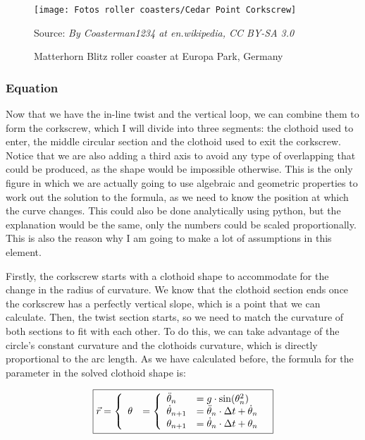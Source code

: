 \documentclass[12pt,twoside,a4paper]{article}
\newcommand{\source}[1]{\caption*{Source: \textit{#1}} }
\begin{document}
	\begin{figure}[H]
		\centering
		\texttt{[image: Fotos roller coasters/Cedar Point Corkscrew]}
		\caption{Matterhorn Blitz roller coaster at Europa Park, Germany}
		\label{fig:CedarPointCorkscrew}
		\source{By Coasterman1234 at en.wikipedia, CC BY-SA 3.0}
	\end{figure}
	
	\subsubsection{Equation}
	Now that we have the in-line twist and the vertical loop, we can combine them to form the corkscrew, which I will divide into three segments: the clothoid used to enter, the middle circular section and the clothoid used to exit the corkscrew. Notice that we are also adding a third axis to avoid any type of overlapping that could be produced, as the shape would be impossible otherwise. This is the only figure in which we are actually going to use algebraic and geometric properties to work out the solution to the formula, as we need to know the position at which the curve changes. This could also be done analytically using python, but the explanation would be the same, only the numbers could be scaled proportionally. This is also the reason why I am going to make a lot of assumptions in this element.
	
	Firstly, the corkscrew starts with a clothoid shape to accommodate for the change in the radius of curvature. We know that the clothoid section ends once the corkscrew has a perfectly vertical slope, which is a point that we can calculate. Then, the twist section starts, so we need to match the curvature of both sections to fit with each other. To do this, we can take advantage of the circle's constant curvature and the clothoids curvature, which is directly proportional to the arc length. As we have calculated before, the formula for the parameter in the solved clothoid shape is:
	
	$$\boxed{\vec{r} = \left\{\begin{array}{ll}
			\theta &= \left\{\begin{array}{ll}
				\ddot{\theta}_n &= g \cdot \sin(\theta^2_n) \cr
				\dot{\theta}_{n + 1} &= \ddot{\theta}_n \cdot \Delta t + \dot{\theta}_n \cr
				\theta_{n + 1} &= \dot{\theta}_n \cdot \Delta t + \theta_n
			\end{array}\right.
		\end{array}\right.}$$
	
\end{document}
